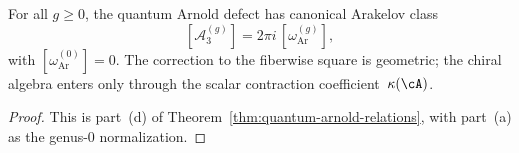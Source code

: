 \begin{corollary}
\label{cor:universal-arakelov}
For all $g \geq 0$, the quantum Arnold defect has canonical
Arakelov class
\begin{equation}\label{eq:universal-arakelov}
[\mathcal{A}_3^{(g)}]
=
2\pi i\,[\omega_{\mathrm{Ar}}^{(g)}],
\end{equation}
with $[\omega_{\mathrm{Ar}}^{(0)}]=0$. The correction to the
fiberwise square is geometric; the chiral algebra enters only through
the scalar contraction coefficient~$\kappa(\cA)$.
\end{corollary}

\begin{proof}
This is part~\textup{(d)} of
Theorem~\ref{thm:quantum-arnold-relations}, with part~\textup{(a)}
as the genus-$0$ normalization.
\end{proof}

\iffalse

